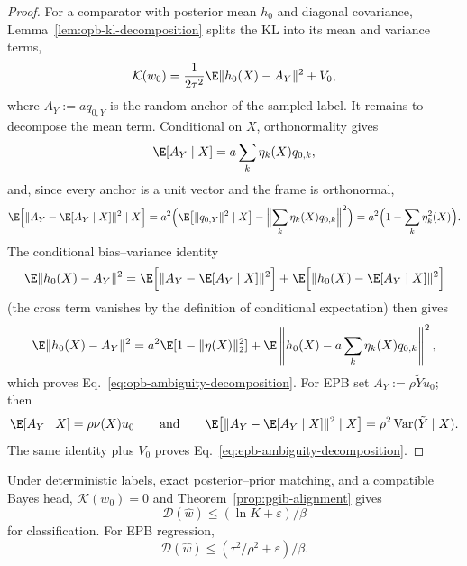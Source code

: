 \begin{proof}
For a comparator with posterior mean $h_0$ and diagonal covariance,
Lemma~\ref{lem:opb-kl-decomposition} splits the KL into its mean and variance
terms,
\begin{equation*}
\mathcal K(w_0)=\frac1{2\tau^2}\E\|h_0(X)-A_Y\|^2+V_0,
\end{equation*}
where $A_Y:=a q_{0,Y}$ is the random anchor of the sampled label. It remains to
decompose the mean term. Conditional on $X$, orthonormality gives
\begin{equation*}
\E[A_Y\mid X]=a\sum_k\eta_k(X)q_{0,k},
\end{equation*}
and, since every anchor is a unit vector and the frame is orthonormal,
\begin{equation*}
\E\Bigl[\|A_Y-\E[A_Y\mid X]\|^2\mid X\Bigr]
=a^2\Bigl(\E\bigl[\|q_{0,Y}\|^2\mid X\bigr]
-\Bigl\|\sum_k\eta_k(X)q_{0,k}\Bigr\|^2\Bigr)
=a^2\Bigl(1-\sum_k\eta_k^2(X)\Bigr).
\end{equation*}
The conditional bias--variance identity
\begin{equation*}
\E\|h_0(X)-A_Y\|^2
=\E\Bigl[\|A_Y-\E[A_Y\mid X]\|^2\Bigr]
+\E\Bigl[\|h_0(X)-\E[A_Y\mid X]\|^2\Bigr]
\end{equation*}
(the cross term vanishes by the definition of conditional expectation) then gives
\begin{equation*}
\E\|h_0(X)-A_Y\|^2
=a^2\E[1-\|\eta(X)\|_2^2]
+\E\left\|h_0(X)-a\sum_k\eta_k(X)q_{0,k}\right\|^2,
\end{equation*}
which proves Eq.~\eqref{eq:opb-ambiguity-decomposition}. For EPB set
$A_Y:=\rho\tilde Y u_0$; then
\begin{equation*}
\E[A_Y\mid X]=\rho\nu(X)u_0
\qquad\text{and}\qquad
\E\bigl[\|A_Y-\E[A_Y\mid X]\|^2\mid X\bigr]
=\rho^2\operatorname{Var}(\tilde Y\mid X).
\end{equation*}
The same identity plus $V_0$ proves Eq.~\eqref{eq:epb-ambiguity-decomposition}.
\end{proof}

\begin{corollary}
\label{cor:pgib-exact-alignment}
Under deterministic labels, exact posterior--prior matching, and a compatible Bayes
head, $\mathcal K(w_0)=0$ and Theorem~\ref{prop:pgib-alignment} gives
\begin{equation}
\mathcal D(\widehat w)\le(\ln K+\varepsilon)/\beta
\label{eq:pgib-alignment}
\end{equation}
for classification. For EPB regression,
\begin{equation}
\mathcal D(\widehat w)\le(\tau^2/\rho^2+\varepsilon)/\beta.
\label{eq:pgib-alignment-regression}
\end{equation}
\end{corollary}

